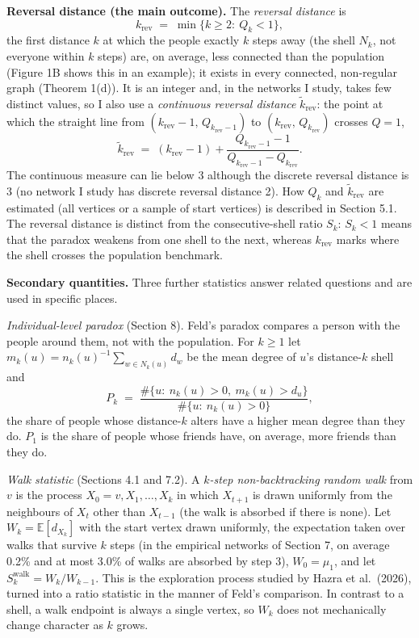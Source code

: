 \documentclass{nws}
\begin{document}
\textbf{Reversal distance (the main outcome).} The \emph{reversal distance} is
\begin{equation*}
k_{\mathrm{rev}} \;=\; \min\{k\ge 2:\ Q_k<1\},
\end{equation*}
the first distance $k$ at which the people exactly $k$ steps away (the shell $N_k$, not everyone within $k$ steps) are, on average, less connected than the population (Figure 1B shows this in an example); it
exists in every connected, non-regular graph (Theorem 1(d)). It is an integer and,
in the networks I study, takes few distinct values, so I also use a
\emph{continuous reversal distance} $\tilde k_{\mathrm{rev}}$: the point at which
the straight line from $(k_{\mathrm{rev}}-1,\,Q_{k_{\mathrm{rev}}-1})$ to
$(k_{\mathrm{rev}},\,Q_{k_{\mathrm{rev}}})$ crosses $Q=1$,
\begin{equation*}
\tilde k_{\mathrm{rev}} \;=\; (k_{\mathrm{rev}}-1)+\frac{Q_{k_{\mathrm{rev}}-1}-1}{Q_{k_{\mathrm{rev}}-1}-Q_{k_{\mathrm{rev}}}} .
\end{equation*}
The continuous measure can lie below 3 although
the discrete reversal distance is 3 (no network I study has discrete reversal distance 2).
How $Q_k$ and $\tilde k_{\mathrm{rev}}$ are estimated (all vertices or a sample of start vertices) is described in Section 5.1. The reversal distance is distinct from the consecutive-shell ratio $S_k$: $S_k<1$ means that the
paradox weakens from one shell to the next, whereas $k_{\mathrm{rev}}$ marks where the
shell crosses the population benchmark.

\textbf{Secondary quantities.} Three further statistics answer related questions and are used
in specific places.

\emph{Individual-level paradox} (Section 8). Feld's paradox compares a person with the
people around them, not with the population. For $k\ge1$ let
$m_k(u)=n_k(u)^{-1}\sum_{w\in N_k(u)}d_w$ be the mean degree of $u$'s
distance-$k$ shell and
\begin{equation*}
P_k \;=\; \frac{\#\{u:\ n_k(u)>0,\ m_k(u)>d_u\}}{\#\{u:\ n_k(u)>0\}} ,
\end{equation*}
the share of people whose distance-$k$ alters have a higher mean degree than
they do. $P_1$ is the share of people whose friends have, on average, more
friends than they do.

\emph{Walk statistic} (Sections 4.1 and 7.2). A \emph{$k$-step non-backtracking random walk} from
$v$ is the process $X_0=v,X_1,\ldots,X_k$ in which $X_{t+1}$ is drawn
uniformly from the neighbours of $X_t$ other than $X_{t-1}$ (the walk is
absorbed if there is none). Let $W_k=\mathbb{E}[d_{X_k}]$ with the start vertex
drawn uniformly, the expectation taken over walks that survive $k$ steps (in the
empirical networks of Section 7, on average 0.2\% and at most 3.0\% of walks are absorbed by step 3), $W_0=\mu_1$, and let $S_k^{\mathrm{walk}}=W_k/W_{k-1}$.
This is the exploration process studied by Hazra et al.\ (2026), turned into a
ratio statistic in the manner of Feld's comparison. In contrast to a shell, a
walk endpoint is always a single vertex, so $W_k$ does not mechanically change
character as $k$ grows.
\end{document}
